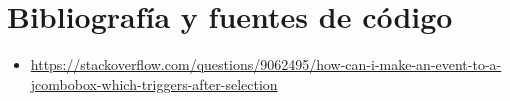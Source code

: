 \documentclass[11pt,a4paper]{article}
\begin{document}
\newpage

\section{Bibliografía y fuentes de código}
\begin{itemize}
	\item \url{https://stackoverflow.com/questions/9062495/how-can-i-make-an-event-to-a-jcombobox-which-triggers-after-selection}
\end{itemize}
\end{document}
